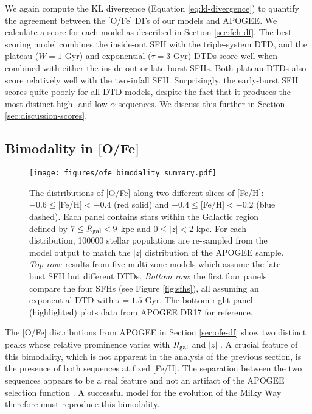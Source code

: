 \documentclass[twocolumn,twocolappendix,linenumbers]{aastex631}
\begin{document}
We again compute the KL divergence (Equation \ref{eq:kl-divergence}) to quantify the agreement between the [O/Fe] DFs of our models and APOGEE. We calculate a score for each model as described in Section \ref{sec:feh-df}. The best-scoring model combines the inside-out SFH with the triple-system DTD, and the plateau ($W=1$ Gyr) and exponential ($\tau=3$ Gyr) DTDs score well when combined with either the inside-out or late-burst SFHs. Both plateau DTDs also score relatively well with the two-infall SFH. Surprisingly, the early-burst SFH scores quite poorly for all DTD models, despite the fact that it produces the most distinct high- and low-$\alpha$ sequences. We discuss this further in Section \ref{sec:discussion-scores}.

\subsection{Bimodality in [O/Fe]}
\label{sec:bimodality}

\begin{figure*}
    \centering
    \texttt{[image: figures/ofe\_bimodality\_summary.pdf]}
    \caption{The distributions of [O/Fe] along two different slices of [Fe/H]: $-0.6\leq$[Fe/H]$<-0.4$ (red solid) and $-0.4\leq$[Fe/H]$<-0.2$ (blue dashed). Each panel contains stars within the Galactic region defined by $7\leq R_{\rm gal}<9$ kpc and $0\leq|z|<2$ kpc. For each distribution, \num{100000} stellar populations are re-sampled from the model output to match the $|z|$ distribution of the APOGEE sample.
    \textit{Top row:} results from five multi-zone models which assume the late-bust SFH but different DTDs. \textit{Bottom row}: the first four panels compare the four SFHs (see Figure \ref{fig:sfhs}), all assuming an exponential DTD with $\tau=1.5$ Gyr. The bottom-right panel (highlighted) plots data from APOGEE DR17 for reference.}
    \label{fig:ofe-bimodality}
\end{figure*}

The [O/Fe] distributions from APOGEE in Section \ref{sec:ofe-df} show two distinct peaks whose relative prominence varies with $R_{\rm gal}$ and $|z|$ \citep[see also Figure 4 of][]{Hayden2015-ChemicalCartography}. A crucial feature of this bimodality, which is not apparent in the analysis of the previous section, is the presence of both sequences at fixed [Fe/H]. The separation between the two sequences appears to be a real feature and not an artifact of the APOGEE selection function \citep{Vincenzo2021-AlphaDistribution}. A successful model for the evolution of the Milky Way therefore must reproduce this bimodality.
\end{document}
